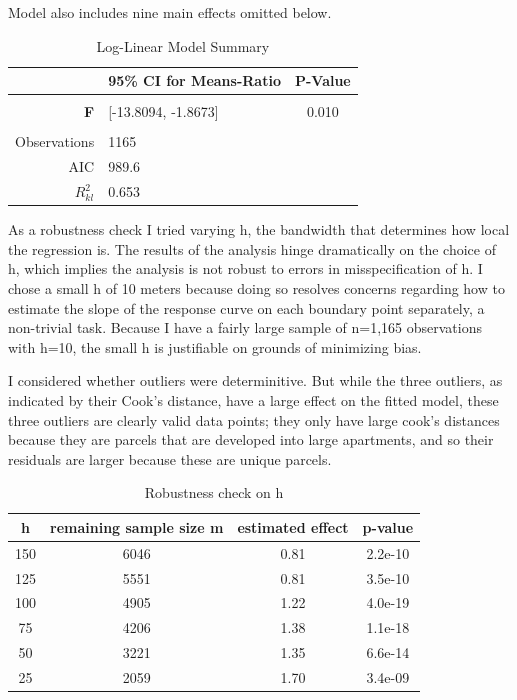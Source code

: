 \documentclass[a4paper,12pt]{article}
\begin{document}
\begin{table}[!htbp] \centering 
  \caption{Log-Linear Model Summary} 
  \small{Model also includes nine main effects omitted below.}
  \label{tab:pois.results} 
\begin{tabular}{@{\extracolsep{0pt}}rlc } 
\\[-1.8ex] & 95\% CI for Means-Ratio & P-Value \\ 
\hline \\[-1.8ex] 
  \textbf{F} & [-13.8094, -1.8673] &  0.010 \\

 \hline \\[-1.8ex] 
Observations & 1165 \\ 
AIC & 989.6 \\ 
$R^2_{kl}$ & 0.653 \\ 
\hline 
\end{tabular} 
\end{table} 

As a robustness check I tried varying h, the bandwidth that determines how local the regression is. The results of the analysis hinge dramatically on the choice of h, which implies the analysis is not robust to errors in misspecification of h. I chose a small h of 10 meters because doing so resolves concerns regarding how to estimate the slope of the response curve on each boundary point separately, a non-trivial task. Because I have a fairly large sample of n=1,165 observations with h=10, the small h is justifiable on grounds of minimizing bias.

I considered whether outliers were determinitive. But while the three outliers, as indicated by their Cook's distance, have a large effect on the fitted model, these three outliers are clearly valid data points; they only have large cook's distances because they are parcels that are developed into large apartments, and so their residuals are larger because these are unique parcels.

\begin{table}[hbt]
\centering
\setlength{\tabcolsep}{10pt} 
\caption{Robustness check on h}
\label{table:robust.h}
\begin{tabular}{|c|c|c|c|}
\hline
h & remaining sample size m & estimated effect & p-value \\
\hline
150 & 6046 & 0.81 & 2.2e-10 \\
125 & 5551 & 0.81 & 3.5e-10 \\
100 & 4905 & 1.22 & 4.0e-19 \\
75 & 4206 & 1.38  & 1.1e-18 \\
50 & 3221 & 1.35 & 6.6e-14 \\
25 & 2059 & 1.70 & 3.4e-09 \\
\hline
\end{tabular}
\end{table}
\end{document}
